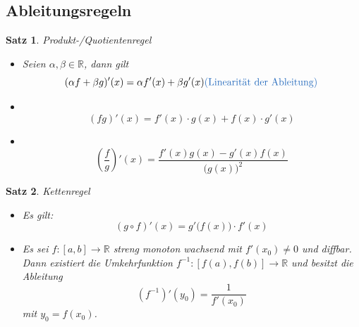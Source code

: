 \documentclass[12pt,a4paper]{report}%
\newtheorem{satz}{Satz}[section]
\numberwithin{equation}{section}
\newcommand{\R}{\mathbb{R}} %
\def\colBlue#1{\begingroup\color{NavyBlue}{#1}\endgroup}
\numberwithin{equation}{subsection}
\begin{document}
  \subsection{Ableitungsregeln}
  \begin{satz} Produkt-/Quotientenregel\newline
    \vspace{-0.5cm}
    \begin{itemize}
      \item[a) ] Seien $\alpha ,\beta \in \R$, dann gilt
        \begin{equation}
          (\alpha f + \beta g)'(x) = \alpha f'(x) + \beta g'(x) \text{\colBlue{(Linearität der Ableitung)}}
        \end{equation}
      \item[b) ] ~\\[-28pt]
        \begin{equation}
          (fg)'(x) = f'(x)\cdot g(x)+f(x) \cdot g'(x)
        \end{equation}
      \item[c) ] ~\\[-28pt]
        \begin{equation}
          (\frac{f}{g})'(x) = \frac{f'(x)g(x)-g'(x)f(x)}{\big(g(x)\big)^2}
        \end{equation}
    \end{itemize}
  \end{satz}
  \begin{satz} Kettenregel\newline
    \vspace{-0.5cm}
    \begin{itemize}
      \item[a) ]Es gilt:
      \begin{equation}
        (g \circ f)'(x) = g' \big(f(x)\big) \cdot f'(x)
      \end{equation}
      \item[b) ] Es sei $f: [a,b] \rightarrow \R$ streng monoton wachsend mit $f'(x_0) \neq 0$ und diffbar. Dann existiert die Umkehrfunktion $f^{-1}:[f(a), f(b)] \rightarrow \R$ und besitzt die Ableitung
      \begin{equation}
        \left( f^{-1}\right)'(y_0) = \frac{1}{f'(x_0)}
      \end{equation}
      mit $y_0 = f(x_0)$.
    \end{itemize}
  \end{satz}
  \newpage
  
\end{document}

